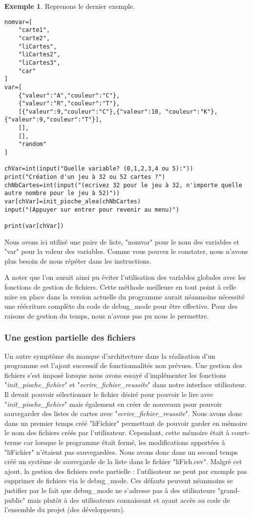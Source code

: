 \documentclass[10pt,a4paper,french,titlepage]{article}
\theoremstyle{definition}
\newtheorem{exmp}{Exemple}
\begin{document}
\begin{exmp}
Reprenons le dernier exemple.
\begin{lstlisting}
nomvar=[
    "carte1",
    "carte2",
    "liCartes",
    "liCartes2",
    "liCartes3",
    "car"
]
var=[
    {"valeur":"A","couleur":"C"},
    {"valeur":"R","couleur":"T"},
    [{"valeur":9,"couleur":"C"},{"valeur":10, "couleur":"K"},{"valeur":9,"couleur":"T"}],
    [],
    [],
    "random"
]

chVar=int(input("Quelle variable? (0,1,2,3,4 ou 5):"))
print("Création d'un jeu à 32 ou 52 cartes ?")
chNbCartes=int(input("(ecrivez 32 pour le jeu à 32, n'importe quelle autre nombre pour le jeu à 52)"))
var[chVar]=init_pioche_alea(chNbCartes)
input("(Appuyer sur entrer pour revenir au menu)")

print(var[chVar])
\end{lstlisting}
Nous avons ici utilisé une paire de liste, "nomvar" pour le nom des variables et "var" pour la valeur des variables. Comme vous pouvez le constater, nous n'avons plus besoin de nous répéter dans les instructions.
\end{exmp}
A noter que l'on aurait ainsi pu éviter l'utilisation des variables globales avec les fonctions de gestion de fichiers. Cette méthode meilleure en tout point à celle mise en place dans la version actuelle du programme aurait néanmoins nécessité une réécriture complète du code de debug\_mode pour être effective. Pour des raisons de gestion du temps, nous n'avons pas pu nous le permettre.
\subsubsection{Une gestion partielle des fichiers}
Un autre symptôme du manque d'architecture dans la réalisation d'un programme est l'ajout successif de fonctionnalités non prévues. Une gestion des fichiers s'est imposé lorsque nous avons essayé d'implémenter les fonctions \\"\textit{init\_pioche\_fichier}" et "\textit{ecrire\_fichier\_reussite}" dans notre interface utilisateur. Il devait pouvoir sélectionner le fichier désiré pour pouvoir le lire avec "\textit{init\_pioche\_fichier}" mais également en créer de nouveaux pour pouvoir sauvegarder des listes de cartes avec "\textit{ecrire\_fichier\_reussite}". Nous avons donc dans un premier temps créé "liFichier" permettant de pouvoir garder en mémoire le nom des fichiers créés par l'utilisateur. Cependant, cette mémoire était à court-terme car lorsque le programme était fermé, les modifications apportées à "liFichier" n'étaient pas sauvegardées. Nous avons donc dans un second temps créé un système de sauvegarde de la liste dans le fichier "liFich.csv". Malgré cet ajout, la gestion des fichiers reste partielle : l'utilisateur ne peut par exemple pas supprimer de fichiers via le debug\_mode. Ces défauts peuvent néanmoins se justifier par le fait que debug\_mode ne s'adresse pas à des utilisateurs "grand-public" mais plutôt à des utilisateurs connaissant et ayant accès au code de l'ensemble du projet (des développeurs).
\end{document}
